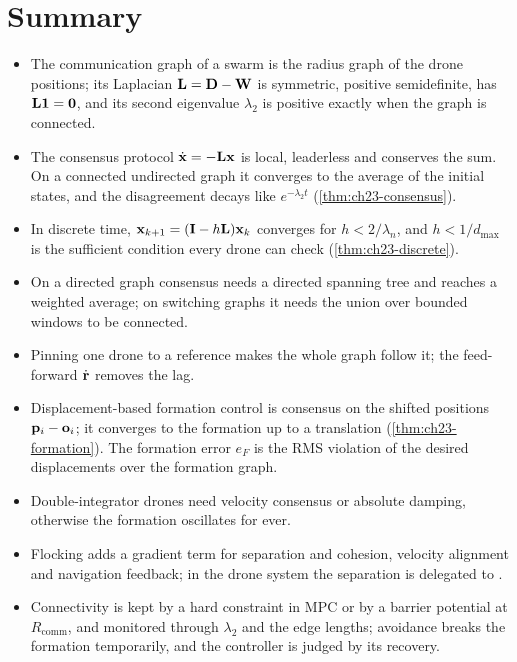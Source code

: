 \section{Summary}
\begin{summary}
\begin{itemize}
  \item The communication graph of a swarm is the radius graph of the drone
    positions; its Laplacian $\mathbf{L} = \mathbf{D} - \mathbf{W}$ is symmetric,
    positive semidefinite, has $\mathbf{L}\mathbf{1} = \mathbf{0}$, and its second
    eigenvalue $\lambda_2$ is positive exactly when the graph is connected.
  \item The consensus protocol $\dot{\mathbf{x}} = -\mathbf{L}\mathbf{x}$ is local,
    leaderless and conserves the sum. On a connected undirected graph it
    converges to the average of the initial states, and the disagreement decays
    like $e^{-\lambda_2 t}$ (\cref{thm:ch23-consensus}).
  \item In discrete time, $\mathbf{x}_{k+1} = (\mathbf{I} - h\mathbf{L})\mathbf{x}_k$
    converges for $h < 2/\lambda_n$, and $h < 1/d_{\max}$ is the
    sufficient condition every drone can check (\cref{thm:ch23-discrete}).
  \item On a directed graph consensus needs a directed spanning tree and
    reaches a weighted average; on switching graphs it needs the union over
    bounded windows to be connected.
  \item Pinning one drone to a reference makes the whole graph follow it;
    the feed-forward $\dot{\mathbf{r}}$ removes the lag.
  \item Displacement-based formation control is consensus on the shifted
    positions $\mathbf{p}_i - \mathbf{o}_i$; it converges to the formation up to a
    translation (\cref{thm:ch23-formation}). The formation error $e_F$ is the
    RMS violation of the desired displacements over the formation graph.
  \item Double-integrator drones need velocity consensus or absolute damping,
    otherwise the formation oscillates for ever.
  \item Flocking adds a gradient term for separation and cohesion, velocity
    alignment and navigation feedback; in the drone system the separation is
    delegated to \orca.
  \item Connectivity is kept by a hard constraint in MPC or by a barrier
    potential at $R_{\mathrm{comm}}$, and monitored through $\lambda_2$ and the
    edge lengths; avoidance breaks the formation temporarily, and the
    controller is judged by its recovery.
\end{itemize}
\end{summary}

